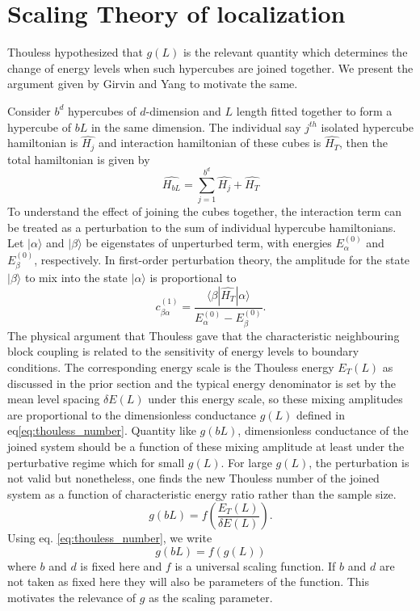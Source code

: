 \section*{Scaling Theory of localization}
Thouless hypothesized that $g(L)$ is the relevant quantity which determines the change of energy levels when such hypercubes are joined together. We present the argument given by Girvin and Yang to motivate the same\cite{GirvinYang2019}. 

Consider $b^d$ hypercubes of $d$-dimension and $L$ length fitted together to form a hypercube of $bL$ in the same dimension. The individual say $j^{th}$ isolated hypercube hamiltonian is $\hat{H_j}$ and interaction hamiltonian of these cubes is $\hat{H_T}$, then the total hamiltonian is given by
\[
\hat{H_{bL}}= \sum_{j=1}^{b^d} {\hat{H_j}} + \hat{H_T}
\]
To understand the effect of joining the cubes together, the interaction term can be treated as a perturbation to the sum of individual hypercube hamiltonians. Let $|\alpha\rangle$ and $|\beta\rangle$ be eigenstates of
unperturbed term, with energies $E_\alpha^{(0)}$ and $E_\beta^{(0)}$,
respectively. In first-order perturbation theory, the amplitude
for the state $|\beta\rangle$ to mix into the state
$|\alpha\rangle$ is proportional to
\begin{equation}
    c_{\beta\alpha}^{(1)}
    =
    \frac{\langle \beta|\hat{H_T} |\alpha\rangle}
         {E_\alpha^{(0)}-E_\beta^{(0)}}.
    \label{eq:mixing_amplitude}
\end{equation}
The physical argument that Thouless gave that the characteristic neighbouring block coupling is related to the sensitivity of energy levels to boundary conditions. The corresponding energy scale is the Thouless energy $E_T(L)$ as discussed in the prior section and the typical energy denominator is set by the mean level spacing $\delta E(L)$ under this energy scale, so these mixing amplitudes are proportional to the dimensionless conductance $g(L)$ defined in eq\ref{eq:thouless_number}.
Quantity like $g(bL)$, dimensionless conductance of the joined system should be a function of these mixing amplitude at least under the perturbative regime which for small $g(L)$. For large $g(L)$, the perturbation is not valid but nonetheless, one finds the new Thouless number of the joined system as a function of characteristic energy ratio rather than the sample size.
\begin{equation}
    g(bL)
    = f\left(\frac{E_T(L)}{\delta E(L)}\right).
\end{equation}
Using eq. \ref{eq:thouless_number}, we write
\begin{equation}
    g(bL)=f(g(L))
\end{equation}
where $b$ and $d$ is fixed here and $f$ is a universal scaling function. If $b$ and $d$ are not taken as fixed here they will also be parameters of the function.
This motivates the relevance of $g$ as the scaling parameter.

